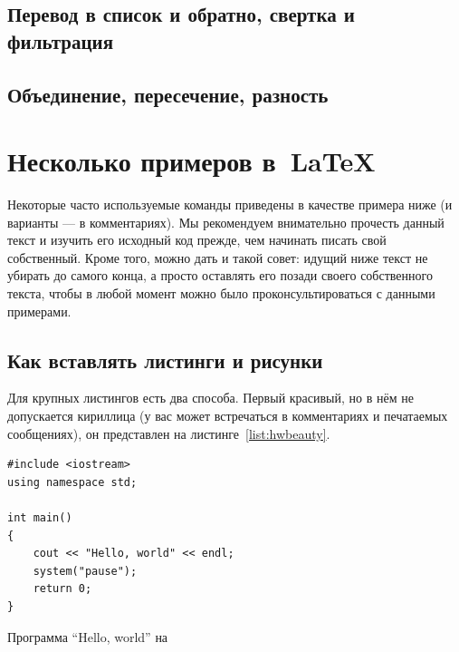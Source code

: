 	\subsection{Перевод в список и обратно, свертка и фильтрация}
	\subsection{Объединение, пересечение, разность}

\section{Несколько примеров в~\LaTeX{}}
\label{sec:examples}

Некоторые часто используемые
команды приведены в качестве примера ниже (и варианты — в
комментариях). Мы рекомендуем внимательно прочесть данный
текст и изучить его исходный код прежде, чем начинать писать
свой собственный. Кроме того, можно дать и такой совет: идущий
ниже текст не убирать до самого конца, а просто оставлять его
позади своего собственного текста, чтобы в любой момент можно
было проконсультироваться с данными примерами.

\subsection{Как вставлять листинги и рисунки}

Для крупных листингов есть два способа. Первый красивый, но в нём не допускается
кириллица (у вас может встречаться в комментариях и
печатаемых сообщениях), он представлен на листинге~\ref{list:hwbeauty}.
\begin{ListingEnv}[H]%
\begin{lstlisting}
#include <iostream>
using namespace std;

int main()
{
    cout << "Hello, world" << endl;
    system("pause");
    return 0;
}
\end{lstlisting}
\caption{Программа “Hello, world” на \protect\cpp}
\label{list:hwbeauty}
\end{ListingEnv}

